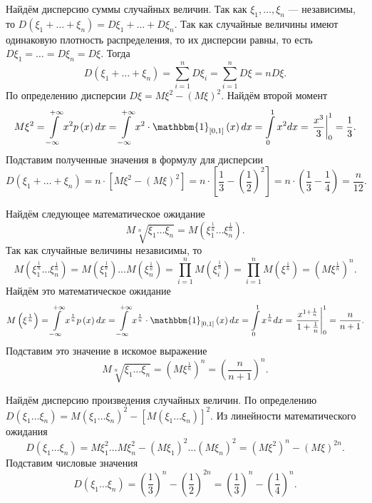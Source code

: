 Найдём дисперсию суммы случайных величин.
Так как $ \xi_1, \dotsc, \xi_n$ --- независимы, то $D \left( \xi_1 + \dotsc + \xi_n \right) = D \xi_1 + \dotsc + D \xi_n$.
Так как случайные величины имеют одинаковую плотность распределения, то их дисперсии равны, то есть $D \xi_1 = \dotsc = D \xi_n = D \xi $.
Тогда
$$D \left( \xi_1 + \dotsc + \xi_n \right) =
\sum \limits_{i=1}^n D \xi_i =
\sum \limits_{i=1}^n D \xi =
nD \xi.$$
По определению дисперсии $D \xi = M \xi^2 - \left( M \xi \right)^2$.
Найдём второй момент
$$M \xi^2 =
\int \limits_{- \infty }^{+ \infty } x^2 p \left( x \right) dx =
\int \limits_{- \infty }^{+ \infty } x^2 \cdot \mathbbm{1}_{ \left[ 0, 1 \right] } \left( x \right) dx =
\int \limits_0^1 x^2 dx =
\left. \frac{x^3}{3} \right|_0^1 =
\frac{1}{3}.$$
Подставим полученные значения в формулу для дисперсии
$$D \left( \xi_1 + \dotsc + \xi_n \right) =
n \cdot \left[ M \xi^2 - \left( M \xi \right)^2 \right] =
n \cdot \left[ \frac{1}{3} - \left( \frac{1}{2} \right)^2 \right] =
n \cdot \left( \frac{1}{3} - \frac{1}{4} \right) =
\frac{n}{12}.$$

Найдём следующее математическое ожидание
$$M \sqrt[n]{ \xi_1 \dotsc \xi_n} =
M \left( \xi_1^{ \frac{1}{n}} \dotsc \xi_n^{ \frac{1}{n}} \right).$$
Так как случайные величины независимы, то
$$M \left( \xi_1^{ \frac{1}{n}} \dotsc \xi_n^{ \frac{1}{n}} \right) =
M \left( \xi_1^{ \frac{1}{n}} \right) \dotsc M \left( \xi_n^{ \frac{1}{n}} \right) =
\prod \limits_{i=1}^n M \left( \xi_i^{ \frac{1}{n}} \right) =
\prod \limits_{i=1}^n M \left( \xi^{ \frac{1}{n}} \right) =
\left( M \xi^{ \frac{1}{n}} \right)^n.$$
Найдём это математическое ожидание
$$M \left( \xi^{ \frac{1}{n}} \right) =
\int \limits_{- \infty }^{+ \infty } x^{ \frac{1}{n}} p \left( x \right) dx =
\int \limits_{- \infty }^{+ \infty } x^{ \frac{1}{n}} \cdot \mathbbm{1}_{ \left[ 0, 1 \right] } \left( x \right) dx =
\int \limits_0^1 x^{ \frac{1}{n}} dx =
\left. \frac{x^{1+ \frac{1}{n}}}{1 + \frac{1}{n}} \right|_0^1 =
\frac{n}{n+1}.$$
Подставим это значение в искомое выражение
$$M \sqrt[n]{ \xi_1 \dotsc \xi_n} =
\left( M \xi^{ \frac{1}{n}} \right)^n =
\left( \frac{n}{n+1} \right)^n.$$

Найдём дисперсию произведения случайных величин.
По определению $D \left( \xi_1 \dotsc \xi_n \right) = M \left( \xi_1 \dotsc \xi_n \right)^2 - \left[ M \left( \xi_1 \dotsc \xi_n \right) \right]^2$.
Из линейности математического ожидания
$$D \left( \xi_1 \dotsc \xi_n \right) =
M \xi_1^2 \dotsc M \xi_n^2 - \left( M \xi_1 \right)^2 \dotsc \left( M \xi_n \right)^2 =
\left( M \xi^2 \right)^n - \left( M \xi \right)^{2n}.$$
Подставим числовые значения
$$D \left( \xi_1 \dotsc \xi_n \right) =
\left( \frac{1}{3} \right)^n - \left( \frac{1}{2} \right)^{2n} =
\left( \frac{1}{3} \right)^n - \left( \frac{1}{4} \right)^n.$$

